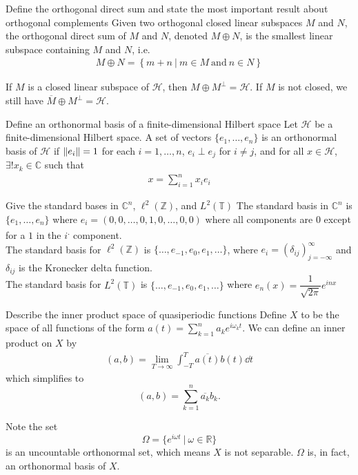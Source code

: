 \documentclass[avery5388,grid,frame]{flashcards}
\def\Rl{\mathbb{R}}
\def\Cx{\mathbb{C}}
\def\hilb{\mathcal{H}}
\def\torus{\mathbb{T}}
\begin{document}
\begin{flashcard}
    {Define the orthogonal direct sum and state the most important result about orthogonal complements}
    Given two orthogonal closed linear subspaces $M$ and $N$, the orthogonal direct sum of $M$ and $N$, denoted $M \oplus N$, is the smallest linear subspace containing $M$ and $N$, i.e.
    \begin{align*}
        M \oplus N = \left\{m + n\ |\ m \in M\ \text{and}\ n \in N\right\}
    \end{align*}

    If $M$ is a closed linear subspace of $\hilb$, then $M \oplus M^\perp = \hilb$.  If $M$ is not closed, we still have $\overline{M} \oplus M^\perp = \hilb$.
\end{flashcard}

\begin{flashcard}
    {Define an orthonormal basis of a finite-dimensional Hilbert space}
    Let $\hilb$ be a finite-dimensional Hilbert space.  A set of vectors $\{e_1, \dots, e_n\}$ is an orthonormal basis of $\hilb$ if $\norm{e_i} = 1$ for each $i = 1, \dots, n$, $e_i \perp e_j$ for $i \neq j$, and for all $x \in \hilb$, $\exists!x_k \in \Cx$ such that
    \begin{align*}
        x = \sum_{i=1}^n x_ie_i
    \end{align*}
\end{flashcard}

\begin{flashcard}
    {Give the standard bases in $\Cx^n$, $\ell^2(\mathbb{Z})$, and $L^2(\torus)$}
    The standard basis in $\Cx^n$ is $\{e_1, \dots, e_n\}$ where $e_i = (0, 0, \dots, 0, 1, 0, \dots, 0, 0)$ where all components are $0$ except for a $1$ in the $i$\textsuperscript. component. \\

    The standard basis for $\ell^2(\mathbb{Z})$ is $\{\dots, e_{-1}, e_0, e_1, \dots\}$, where $e_i = (\delta_{ij})_{j=-\infty}^\infty$ and $\delta_{ij}$ is the Kronecker delta function. \\

    The standard basis for $L^2(\torus)$ is $\{\dots, e_{-1}, e_0, e_1, \dots\}$ where $e_n(x) = \dfrac{1}{\sqrt{2\pi}}e^{inx}$
\end{flashcard}

\begin{flashcard}
    {Describe the inner product space of quasiperiodic functions}
    Define $X$ to be the space of all functions of the form $a(t) = \displaystyle\sum_{k=1}^n a_ke^{i\omega_k t}$.  We can define an inner product on $X$ by
    \begin{align*}
        (a,b) = \lim_{T\rightarrow \infty}\int_{-T}^T\overline{a(t)}b(t) \dd t
    \end{align*}
    which simplifies to $$(a,b) = \displaystyle\sum_{k=1}^n \overline{a_k}b_k.$$

    Note the set $$\Omega = \{e^{i\omega t}\ |\ \omega \in \Rl\}$$ is an uncountable orthonormal set, which means $X$ is not separable.  $\Omega$ is, in fact, an orthonormal basis of $X$.
\end{flashcard}
\end{document}
